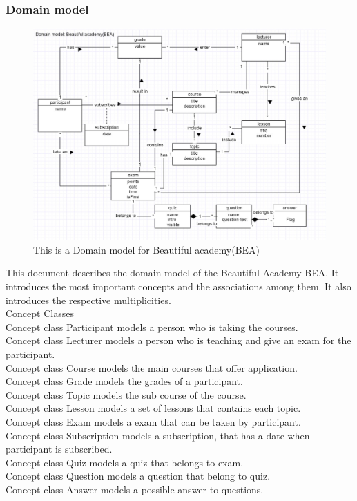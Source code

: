\documentclass{scrartcl}
\begin{document}
\subsubsection{Domain model}  
\begin{figure}[h]
\centering
\includegraphics[width=150mm]{domain-in-use.JPG}
\caption{This is a Domain model for Beautiful academy(BEA)}
\label{Life Cucle Models}
\end{figure}

This document describes the domain model of the Beautiful Academy BEA. It introduces the most important concepts and the associations among them. It also introduces the respective multiplicities. \\

Concept Classes \\

Concept class Participant models a person who is taking the courses. \\
Concept class Lecturer models a person who is teaching and give an exam for the participant.\\
Concept class Course models the main courses that offer application.\\
Concept class Grade models the grades of a participant.\\
Concept class Topic models the sub course of the course.\\
Concept class Lesson models a set of lessons that contains each topic.\\
Concept class Exam models a exam that can be taken by participant.\\
Concept class Subscription models a subscription, that has a date when participant is subscribed.\\
Concept class Quiz models a quiz that belongs to exam.\\
Concept class Question models a question that belong to quiz.\\
Concept class Answer models a possible answer to questions.\\
\end{document}
